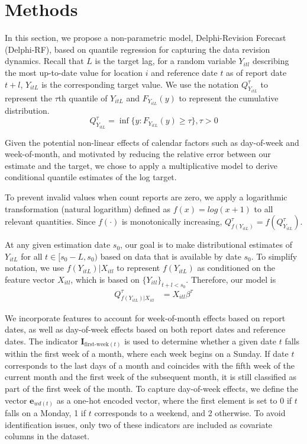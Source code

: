 \section{Methods}
In this section, we propose a non-parametric model, Delphi-Revision Forecast (Delphi-RF), based on quantile regression for capturing the data revision dynamics.
Recall that $L$ is the target lag, for a random variable $Y_{itl}$ describing the most up-to-date value for location $i$ and reference date $t$ as of report date $t+l$, $Y_{itL}$ is the corresponding target value. We use the notation $Q_{Y_{itL}}^{\tau}$ to represent the $\tau$th quantile of $Y_{itL}$ and $F_{Y_{itL}}(y)$ to represent the cumulative distribution.
$$Q_{Y_{itL}}^{\tau} = \inf \{y: F_{Y_{itL}}(y) \geq \tau\}, \tau > 0$$

Given the potential non-linear effects of calendar factors such as day-of-week and week-of-month, and motivated by reducing the relative error between our estimate and the target, we chose to apply a multiplicative model to derive conditional quantile estimates of the log target. 

To prevent invalid values when count reports are zero, we apply a logarithmic transformation (natural logarithm) defined as $f(x) = log(x + 1)$ to all relevant quantities. Since $f(\cdot)$ is monotonically increasing, $ Q_{f(Y_{itL})}^{\tau} = f(Q_{Y_{itL}}^{\tau})$. 

At any given estimation date $s_0$, our goal is to make distributional estimates of $Y_{itL}$ for all $t \in [s_0-L, s_0)$ based on data that is available by date $s_0$. To simplify notation, we use $f(Y_{itL})|X_{itl}$ to represent $f(Y_{itL})$ as conditioned on the feature vector $X_{itl}$, which is based on $\{Y_{itl}\}_{t+l < s_0}$. Therefore, our model is 
\begin{align*} 
Q_{f(Y_{itL})|X_{itl}}^{\tau} &=  X_{itl}\beta^{\tau}
\end{align*}

We incorporate features to account for week-of-month effects based on report dates, as well as day-of-week effects based on both report dates and reference dates. The indicator \( \mathbf{I}_{\text{first-week}(t)} \) is used to determine whether a given date \( t \) falls within the first week of a month, where each week begins on a Sunday. If date \( t \) corresponds to the last days of a month and coincides with the fifth week of the current month and the first week of the subsequent month, it is still classified as part of the first week of the month. To capture day-of-week effects, we define the vector \( \mathbf{e}_{wd(t)} \) as a one-hot encoded vector, where the first element is set to 0 if \( t \) falls on a Monday, 1 if \( t \) corresponds to a weekend, and 2 otherwise. To avoid identification issues, only two of these indicators are included as covariate columns in the dataset.


